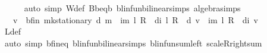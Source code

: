\begin{isabellebody}
\ \ \ \ \isamarkupfalse%
\ {\isacharparenleft}{\kern0pt}auto\ simp{\isacharcolon}{\kern0pt}\ W{\isacharunderscore}{\kern0pt}def\ B\isactrlsub b{\isacharunderscore}{\kern0pt}eq{\isacharunderscore}{\kern0pt}{\isasymL}\isactrlsub b\ blinfun{\isachardot}{\kern0pt}bilinear{\isacharunderscore}{\kern0pt}simps\ algebra{\isacharunderscore}{\kern0pt}simps\ {\isacharparenright}{\kern0pt}\isanewline
\ \ \isamarkupfalse%
\ \isamarkupfalse%
\ {\isachardoublequoteopen}{\isasymdots}\ {\isacharequal}{\kern0pt}\ v\ {\isacharplus}{\kern0pt}\ {\isasymnu}\isactrlsub b{\isacharunderscore}{\kern0pt}fin\ {\isacharparenleft}{\kern0pt}mk{\isacharunderscore}{\kern0pt}stationary\ d{\isacharparenright}{\kern0pt}\ m\ {\isacharplus}{\kern0pt}\ {\isacharparenleft}{\kern0pt}{\isasymSum}i{\isacharless}{\kern0pt}m{\isachardot}{\kern0pt}\ {\isacharparenleft}{\kern0pt}{\isacharparenleft}{\kern0pt}l\ {\isacharasterisk}{\kern0pt}\isactrlsub R\ {\isasymP}\ d{\isacharparenright}{\kern0pt}{\isacharcircum}{\kern0pt}{\isacharcircum}{\kern0pt}i{\isacharparenright}{\kern0pt}\ {\isacharparenleft}{\kern0pt}{\isacharparenleft}{\kern0pt}l\ {\isacharasterisk}{\kern0pt}\isactrlsub R\ {\isasymP}\ d{\isacharparenright}{\kern0pt}\ v{\isacharparenright}{\kern0pt}{\isacharparenright}{\kern0pt}\ {\isacharminus}{\kern0pt}\ {\isacharparenleft}{\kern0pt}{\isasymSum}i{\isacharless}{\kern0pt}m{\isachardot}{\kern0pt}\ {\isacharparenleft}{\kern0pt}l\ {\isacharasterisk}{\kern0pt}\isactrlsub R\ {\isasymP}\ d{\isacharparenright}{\kern0pt}{\isacharcircum}{\kern0pt}{\isacharcircum}{\kern0pt}i{\isacharparenright}{\kern0pt}\ v{\isachardoublequoteclose}\isanewline
\ \ \ \ \isamarkupfalse%
\ L{\isacharunderscore}{\kern0pt}def\isanewline
\ \ \ \ \isamarkupfalse%
\ {\isacharparenleft}{\kern0pt}auto\ simp{\isacharcolon}{\kern0pt}\ {\isasymnu}\isactrlsub b{\isacharunderscore}{\kern0pt}fin{\isacharunderscore}{\kern0pt}eq\ blinfun{\isachardot}{\kern0pt}bilinear{\isacharunderscore}{\kern0pt}simps\ blinfun{\isachardot}{\kern0pt}sum{\isacharunderscore}{\kern0pt}left\ scaleR{\isacharunderscore}{\kern0pt}right{\isachardot}{\kern0pt}sum{\isacharparenright}{\kern0pt}\isanewline
\ \ \isamarkupfalse%
\ \isamarkupfalse%

\end{isabellebody}
